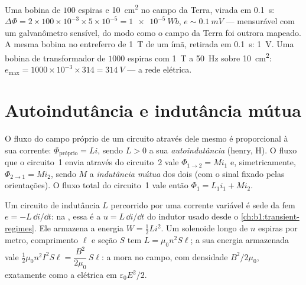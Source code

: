 \begin{example}\label{ex:b1:induction:orders}
Uma bobina de $100$ espiras e \qty{10}{cm^2} no campo da Terra, virada em
\qty{0.1}{s}: $\Delta\Phi = 2 \times 100 \times 10^{-3} \times 5 \times 10^{-5} = \qty{1e-5}{Wb}$,
$e \sim \qty{0.1}{mV}$ --- mensurável com um galvanômetro sensível, do modo como
o campo da Terra foi outrora mapeado. A mesma bobina no entreferro de \qty{1}{T}
de um ímã, retirada em \qty{0.1}{s}: \qty{1}{V}. Uma bobina de transformador de
$1000$ espiras com \qty{1}{T} a \qty{50}{Hz} sobre \qty{10}{cm^2}: $e_{\max} =
1000 \times 10^{-3} \times 314 = \qty{314}{V}$ --- a rede elétrica.
\end{example}

\section{Autoindutância e indutância mútua}

\begin{definition}[Indutância]\label{def:b1:induction:inductance}
O fluxo do campo próprio de um circuito através dele mesmo é proporcional à sua
corrente: $\Phi_{\text{próprio}} = Li$, sendo $L > 0$ a sua \emph{autoindutância}
(henry, \unit{H}). O fluxo que o circuito~1 envia através do circuito~2 vale
$\Phi_{1 \to 2} = Mi_1$ e, simetricamente, $\Phi_{2 \to 1} = Mi_2$, sendo $M$
a \emph{indutância mútua} dos dois (com o sinal fixado pelas orientações). O
fluxo total do circuito~1 vale então $\Phi_1 = L_1i_1 + Mi_2$.
\end{definition}

\begin{proposition}\label{prop:b1:induction:inductor}
Um circuito de indutância $L$ percorrido por uma corrente variável é sede
da fem $e = -L\,\dd i/\dd t$: na , essa é a
 $u = L\,\dd i/\dd t$ do indutor usado desde o
\cref{ch:b1:transient-regimes}. Ele armazena a energia $W = \tfrac12Li^2$.
Um solenoide longo de $n$ espiras por metro, comprimento $\ell$ e seção $S$
tem $L = \mu_0n^2S\ell$; a sua energia armazenada vale $\tfrac12\mu_0n^2I^2S\ell =
\dfrac{B^2}{2\mu_0}\,S\ell$: a  mora no campo, com
densidade $B^2/2\mu_0$, exatamente como a elétrica em $\varepsilon_0E^2/2$.
\end{proposition}

